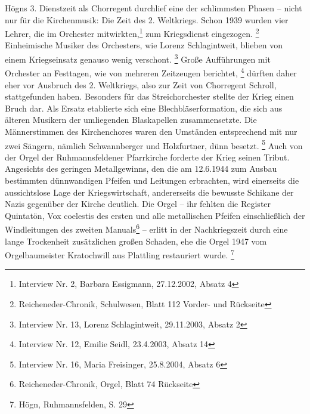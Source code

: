 Högns 3. Dienstzeit als Chorregent durchlief eine der schlimmsten Phasen
– nicht nur für die Kirchenmusik: Die Zeit des 2. Weltkriegs. Schon
1939 wurden vier Lehrer, die im Orchester mitwirkten,\footnote{
Interview Nr. 2, Barbara Essigmann, 27.12.2002, Absatz 4} zum
Kriegsdienst eingezogen. \footnote{Reicheneder-Chronik, Schulwesen,
Blatt 112 Vorder- und Rückseite} Einheimische Musiker des Orchesters,
wie Lorenz Schlagintweit, blieben von einem Kriegseinsatz genauso wenig
verschont. \footnote{Interview Nr. 13, Lorenz Schlagintweit,
29.11.2003, Absatz 2} Große Aufführungen mit Orchester an Festtagen,
wie von mehreren Zeitzeugen berichtet, \footnote{Interview Nr. 12,
Emilie Seidl, 23.4.2003, Absatz 14} dürften daher eher vor Ausbruch des
2. Weltkriegs, also zur Zeit von Chorregent Schroll, stattgefunden
haben. Besonders für das Streichorchester stellte der Krieg einen Bruch
dar. Als Ersatz etablierte sich eine Blechbläserformation, die sich aus
älteren Musikern der umliegenden Blaskapellen zusammensetzte. Die
Männerstimmen des Kirchenchores waren den Umständen entsprechend mit
nur zwei Sängern, nämlich Schwannberger und Holzfurtner, dünn
besetzt. \footnote{Interview Nr. 16, Maria Freisinger, 25.8.2004,
Absatz 6} Auch von der Orgel der Ruhmannsfeldener Pfarrkirche forderte
der Krieg seinen Tribut. Angesichts des geringen Metallgewinns, den die
am 12.6.1944 zum Ausbau bestimmten dünnwandigen Pfeifen und Leitungen
erbrachten, wird einerseits die aussichtslose Lage der
Kriegswirtschaft, andererseits die bewusste Schikane der Nazis
gegenüber der Kirche deutlich. Die Orgel – ihr fehlten die Register
Quintatön, Vox coelestis des ersten und alle metallischen Pfeifen
einschließlich der Windleitungen des zweiten Manuals\footnote{
Reicheneder-Chronik, Orgel, Blatt 74 Rückseite} – erlitt in der
Nachkriegszeit durch eine lange Trockenheit zusätzlichen großen
Schaden, ehe die Orgel 1947 vom Orgelbaumeister Kratochwill aus
Plattling restauriert wurde. \footnote{Högn, Ruhmannsfelden, S. 29}

